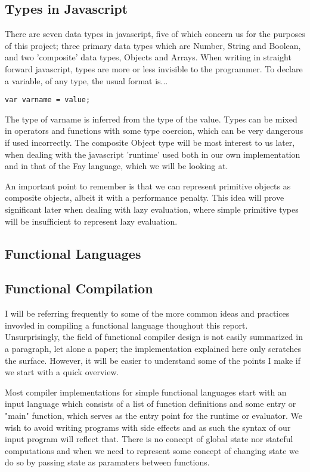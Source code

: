 \documentclass[11pt]{article}
\begin{document}
\subsection{Types in Javascript}
There are seven data types in javascript, five of which concern us for the purposes
of this project; three primary data types which are Number, String and Boolean, 
and two 'composite' data types, Objects and Arrays. When writing in straight
forward javascript, types are more or less invisible to the programmer. To declare
a variable, of any type, the usual format is...
\begin{verbatim}
var varname = value;
\end{verbatim}
The type of varname is inferred from the type of the value. Types can be mixed
in operators and functions with some type coercion, which can be very dangerous
if used incorrectly. The composite Object type will be most interest to us later,
when dealing with the javascript 'runtime' used both in our own implementation
and in that of the Fay language, which we will be looking at.

An important point to remember is that we can represent primitive objects as
composite objects, albeit it with a performance penalty. This idea will prove
significant later when dealing with lazy evaluation, where simple primitive
types will be insufficient to represent lazy evaluation.

\subsection{Functional Languages}

\subsection{Functional Compilation}
I will be referring frequently to some of the more common ideas and practices
invovled in compiling a functional language thoughout this report. Unsurprisingly,
the field of functional compiler design is not easily summarized in a paragraph,
let alone a paper; the implementation explained here only scratches the surface.
However, it will be easier to understand some of the points I make if we start
with a quick overview.

Most compiler implementations for simple functional languages start with an 
input language which consists of a list of function definitions and some entry
or "main" function, which serves as the entry point for the runtime or evaluator.
We wish to avoid writing programs with side effects and as such the syntax of
our input program will reflect that. There is no concept of global state nor
stateful computations and when we need to represent some concept of changing
state we do so by passing state as paramaters between functions. 
\end{document}
